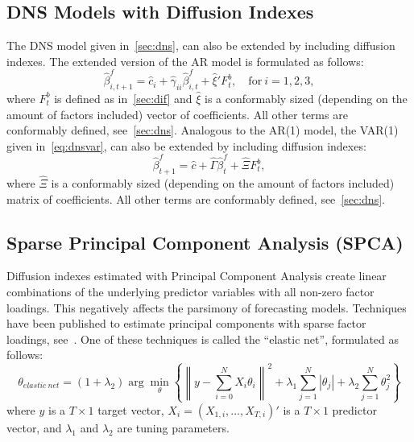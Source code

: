 \subsection{DNS Models with Diffusion Indexes}
\label{sec:dnsdif}
The DNS model given in~\cref{sec:dns}, can also be extended by including diffusion indexes. The extended version of the AR model is formulated as follows:
\begin{equation}
	\hat{\beta}_{i,t+1}^{f} = \hat{c}_i + \hat{\gamma}_{ii} \hat{\beta}_{i,t}^f + \hat{\xi}' F_t^b, \quad \text{for}~i = 1,2,3,
\end{equation}
where $F_t^b$ is defined as in~\cref{sec:dif} and $\hat{\xi}$ is a conformably sized (depending on the amount of factors included) vector of coefficients. All other terms are conformably defined, see~\cref{sec:dns}. Analogous to the AR(1) model, the VAR(1) given in~\cref{eq:dnsvar}, can also be extended by including diffusion indexes:
\begin{equation}
	\hat{\beta}_{t+1}^{f} = \hat{c} + \hat{\Gamma} \hat{\beta}_t^f + \hat{\Xi} F_t^b,
\end{equation}
where $\hat{\Xi}$ is a conformably sized (depending on the amount of factors included) matrix of coefficients. All other terms are conformably defined, see~\cref{sec:dns}.

\subsection{Sparse Principal Component Analysis (SPCA)}
\label{sec:spca}
Diffusion indexes estimated with Principal Component Analysis create linear combinations of the underlying predictor variables with all non-zero factor loadings. This negatively affects the parsimony of forecasting models. Techniques have been published to estimate principal components with sparse factor loadings, see~\textcite{Zou2006}. One of these techniques is called the \enquote{elastic net}, formulated as follows:
\begin{equation}
	\theta_{elastic\ net} = (1 + \lambda_2) \arg \underset{\theta}{\min} \left\{{\left\| y - \sum_{i=0}^{N} X_i \theta_i \right\|}^2 + \lambda_1 \sum_{j=1}^N \left|\theta_j\right| + \lambda_2 \sum_{j=1}^N \theta_j^2 \right\}
\end{equation}
where $y$ is a $T \times 1$ target vector, $X_i = \left(X_{1,i}, \dots, X_{T,i}\right)'$ is a $T \times 1$ predictor vector, and $\lambda_1$ and $\lambda_2$ are tuning parameters.

